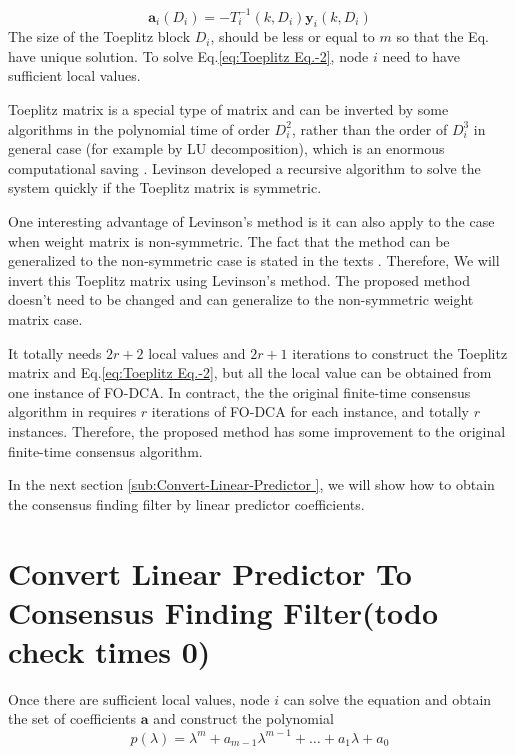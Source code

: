 \begin{equation}
\mathbf{a}_{i}\left(D_{i}\right)=-T_{i}^{-1}\left(k,D_{i}\right)\mathbf{y}_{i}\left(k,D_{i}\right)\label{eq:Toeplitz Eq.-2}
\end{equation}
The size of the Toeplitz block $D_{i}$, should be less or equal to
$m$ so that the Eq.  have unique solution.
To solve Eq.\ref{eq:Toeplitz Eq.-2}, node $i$ need to have sufficient
local values.

Toeplitz matrix is a special type of matrix and can be inverted by
some algorithms in the polynomial time of order $D_{i}^{2}$, rather
than the order of $D_{i}^{3}$ in general case (for example by LU
decomposition), which is an enormous computational saving \cite{Prass2007}.
Levinson developed a recursive algorithm to solve the system quickly
if the Toeplitz matrix is symmetric. 

One interesting advantage of Levinson's method is it can also apply
to the case when weight matrix is non-symmetric. The fact that the
method can be generalized to the non-symmetric case is stated in the
texts \cite{Robinson2000}.  Therefore, We will invert this Toeplitz
matrix using Levinson's method. The proposed method  doesn't need
to be changed and can generalize to the non-symmetric weight matrix
case. 

It totally needs $2r+2$ local values and $2r+1$ iterations to construct
the Toeplitz matrix and Eq.\ref{eq:Toeplitz Eq.-2}, but all the local
value can be obtained from one instance of FO-DCA. In contract, the
the original finite-time consensus algorithm in \cite{Sundaram2007}
requires $r$ iterations of FO-DCA for each instance, and totally
$r$ instances. Therefore, the proposed method has some improvement
to the original finite-time consensus algorithm. 

In the next section \ref{sub:Convert-Linear-Predictor }, we will
show how to obtain the consensus finding filter by linear predictor
coefficients.


\section{\label{sub:Convert-Linear-Predictor }Convert Linear Predictor To
Consensus Finding Filter(todo check times 0)}

Once there are sufficient local values, node $i$ can solve the equation
and obtain the set of coefficients \textbf{$\mathbf{a}$} and construct
the polynomial 
\[
p(\lambda)=\lambda^{m}+a_{m-1}\lambda^{m-1}+\ldots+a_{1}\lambda+a_{0}
\]


